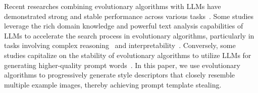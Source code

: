 Recent researches combining evolutionary algorithms with LLMs have demonstrated strong and stable performance across various tasks~\citep{yang2023large, liu2023large}. Some studies leverage the rich domain knowledge and powerful text analysis capabilities of LLMs to accelerate the search process in evolutionary algorithms, particularly in tasks involving complex reasoning~\citep{meyerson2024language,liu2024large,lange2024large,brahmachary2024large} and interpretability~\citep{chiquier2025evolving}. Conversely, some studies capitalize on the stability of evolutionary algorithms to utilize LLMs for generating higher-quality prompt words~\citep{xu2022gps,prasad2022grips,guo2023connecting,fernando2023promptbreeder}. In this paper, we use evolutionary algorithms to progressively generate style descriptors that closely resemble multiple example images, thereby achieving prompt template stealing.